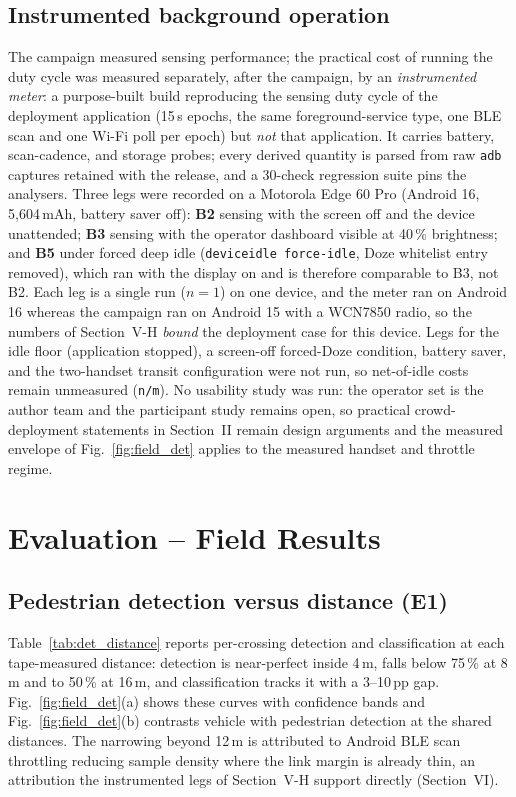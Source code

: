 \documentclass[journal,10pt]{IEEEtran}
\begin{document}
\subsection{Instrumented background operation}
\label{sec:background}
The campaign measured sensing performance; the practical cost of running the
duty cycle was measured separately, after the campaign, by an
\emph{instrumented meter}: a purpose-built build reproducing the sensing duty
cycle of the deployment application (15\,s epochs, the same foreground-service
type, one BLE scan and one Wi-Fi poll per epoch) but \emph{not} that
application. It carries battery, scan-cadence, and storage probes; every
derived quantity is parsed from raw \texttt{adb} captures retained with the
release, and a 30-check regression suite pins the analysers. Three legs were
recorded on a Motorola Edge 60 Pro (Android 16, 5{,}604\,mAh, battery saver
off): \textbf{B2} sensing with the screen off and the device unattended;
\textbf{B3} sensing with the operator dashboard visible at 40\,\% brightness;
and \textbf{B5} under forced deep idle (\texttt{deviceidle force-idle}, Doze
whitelist entry removed), which ran with the display on and is therefore
comparable to B3, not B2. Each leg is a single run ($n=1$) on one device, and
the meter ran on Android 16 whereas the campaign ran on Android 15 with a
WCN7850 radio, so the numbers of Section~V-H \emph{bound} the deployment case
for this device. Legs for the idle floor (application stopped), a screen-off
forced-Doze condition, battery saver, and the two-handset transit
configuration were not run, so net-of-idle costs remain unmeasured
(\texttt{n/m}). No usability study was run: the operator set is the author
team and the participant study remains open, so practical crowd-deployment
statements in Section~II remain design arguments and the measured envelope of
Fig.~\ref{fig:field_det} applies to the measured handset and throttle regime.

\section{Evaluation -- Field Results}
\label{sec:results}

\subsection{Pedestrian detection versus distance (E1)}
Table~\ref{tab:det_distance} reports per-crossing detection and classification
at each tape-measured distance: detection is near-perfect inside 4\,m, falls
below 75\,\% at 8\,m and to 50\,\% at 16\,m, and classification
tracks it with a 3--10\,pp gap. Fig.~\ref{fig:field_det}(a) shows these curves
with confidence bands and Fig.~\ref{fig:field_det}(b) contrasts vehicle with
pedestrian detection at the shared distances. The narrowing beyond 12\,m is
attributed to Android BLE scan throttling reducing sample density where the
link margin is already thin, an attribution the instrumented legs of
Section~V-H support directly (Section~VI).
\end{document}
